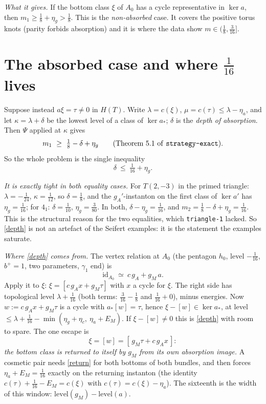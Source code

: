 \documentclass[10pt]{amsart}
\newcommand{\st}[1]{\par\noindent\textit{#1}\enspace}
\begin{document}
\st{What it gives.} If the bottom class $\xi$ of $A_0$ has a cycle representative in $\ker a$,
then $m_1\ge\frac18+\eta_g>\frac18$. This is the \emph{non-absorbed} case. It covers the
positive torus knots (parity forbids absorption) and it is where the data show
$m\in(\frac18,\frac3{16}]$.

\section{The absorbed case and where $\frac1{16}$ lives}

Suppose instead $a\xi=\tau\ne0$ in $H(T)$. Write $\lambda=c(\xi)$, $\mu=c(\tau)\le\lambda-\eta_a$,
and let $\kappa=\lambda+\delta$ be the lowest level of a class of $\ker a_*$; $\delta$ is the
\emph{depth of absorption}. Then $\Psi$ applied at $\kappa$ gives
\[
m_1\ \ge\ \tfrac18-\delta+\eta_g\qquad(\text{Theorem 5.1 of \texttt{strategy-exact}}).
\]
So the whole problem is the single inequality
\begin{equation}\label{depth}
\delta\ \le\ \tfrac1{16}+\eta_g .
\end{equation}
\st{It is exactly tight in both equality cases.} For $T(2,-3)$ in the primed triangle:
$\lambda=-\frac1{24}$, $\kappa=\frac1{12}$, so $\delta=\frac18$, and the $g_A'$-instanton on the
first class of $\ker a'$ has $\eta_g=\frac1{16}$; for $4_1$: $\delta=\frac1{10}$,
$\eta_g=\frac3{80}$. In both, $\delta-\eta_g=\frac1{16}$, and
$m_2=\frac18-\delta+\eta_g=\frac1{16}$. This is the structural reason for the two
equalities, which \texttt{triangle-1} lacked. So \eqref{depth} is not an artefact of the
Seifert examples: it is the statement the examples saturate.

\st{Where \eqref{depth} comes from.} The vertex relation at $A_0$ (the pentagon $h_0$,
level $-\frac1{16}$, $b^+=1$, two parameters, $\gamma_1$ end) is
\[
\mathrm{id}_{A_0}\ \simeq\ c\,g_A+g_M\,a .
\]
Apply it to $\xi$: $\xi=[c\,g_A x+g_M\tau]$ with $x$ a cycle for $\xi$. The right side has
topological level $\lambda+\frac1{16}$ (both terms: $\frac3{16}-\frac18$ and $\frac1{16}+0$),
minus energies. Now $w:=c\,g_Ax+g_M\tau$ is a cycle with $a_*[w]=\tau$, hence $\xi-[w]\in\ker a_*$,
at level $\le\lambda+\frac1{16}-\min(\eta_g+\eta_c,\ \eta_a+E_M)$. If $\xi-[w]\ne0$ this is
\eqref{depth} with room to spare. The one escape is
\begin{equation}\label{return}
\xi=[w]=[\,g_M\tau+c\,g_Ax\,]:
\end{equation}
\emph{the bottom class is returned to itself by $g_M$ from its own absorption image.} A
cosmetic pair needs \eqref{return} for both bottoms of both bundles, and then forces
$\eta_a+E_M=\frac1{16}$ exactly on the returning instanton (the identity
$c(\tau)+\frac1{16}-E_M=c(\xi)$ with $c(\tau)=c(\xi)-\eta_a$). The sixteenth is the width of this
window: $\mathrm{level}(g_M)-\mathrm{level}(a)$.
\end{document}
